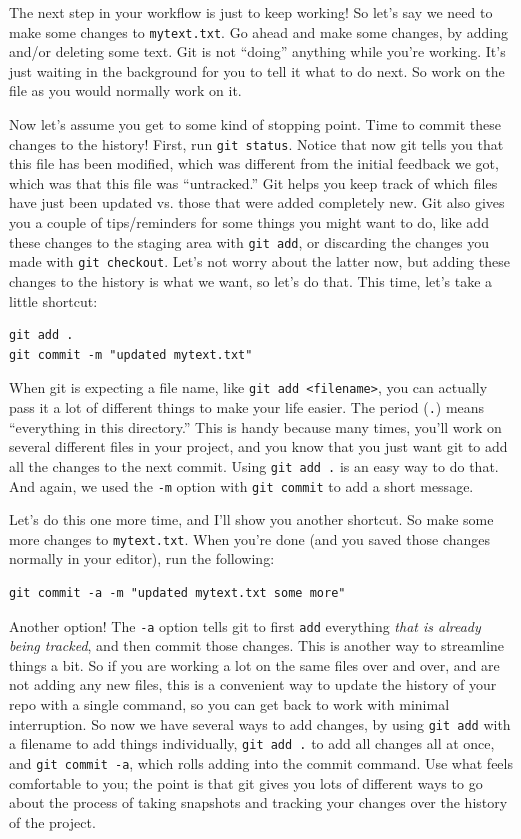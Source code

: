 \documentclass[11pt]{article}
\begin{document}
The next step in your workflow is just to keep working!  So let's say we need to make some changes to \texttt{mytext.txt}.  Go ahead and make some changes, by adding and/or deleting some text. Git is not ``doing'' anything while you're working. It's just waiting in the background for you to tell it what to do next.  So work on the file as you would normally work on it.

Now let's assume you get to some kind of stopping point.  Time to commit these changes to the history!  First, run \texttt{git status}.  Notice that now git tells you that this file has been modified, which was different from the initial feedback we got, which was that this file was ``untracked.'' Git helps you keep track of which files have just been updated vs. those that were added completely new.  Git also gives you a couple of tips/reminders for some things you might want to do, like add these changes to the staging area with \texttt{git add}, or discarding the changes you made with \texttt{git checkout}.  Let's not worry about the latter now, but adding these changes to the history is what we want, so let's do that.  This time, let's take a little shortcut:


\begin{verbatim}
git add .
git commit -m "updated mytext.txt"
\end{verbatim}

When git is expecting a file name, like \texttt{git add <filename>}, you can actually pass it a lot of different things to make your life easier.  The period (\texttt{.}) means ``everything in this directory.''  This is handy because many times, you'll work on several different files in your project, and you know that you just want git to add all the changes to the next commit.  Using \texttt{git add .} is an easy way to do that.  And again, we used the \texttt{-m} option with \texttt{git commit} to add a short message.

Let's do this one more time, and I'll show you another shortcut. So make some more changes to \texttt{mytext.txt}.  When you're done (and you saved those changes normally in your editor), run the following:


\begin{verbatim}
git commit -a -m "updated mytext.txt some more"
\end{verbatim}

Another option! The \texttt{-a} option tells git to first \texttt{add} everything \emph{that is already being tracked}, and then commit those changes.  This is another way to streamline things a bit.  So if you are working a lot on the same files over and over, and are not adding any new files, this is a convenient way to update the history of your repo with a single command, so you can get back to work with minimal interruption.  So now we have several ways to add changes, by using \texttt{git add} with a filename to add things individually, \texttt{git add .} to add all changes all at once, and \texttt{git commit -a}, which rolls adding into the commit command.  Use what feels comfortable to you; the point is that git gives you lots of different ways to go about the process of taking snapshots and tracking your changes over the history of the project.
\end{document}
